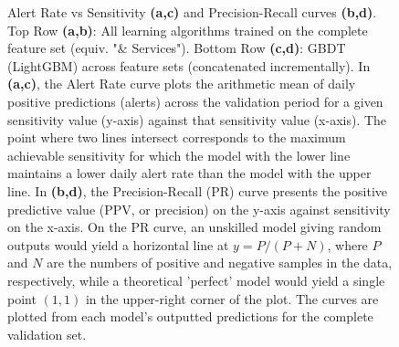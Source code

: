 \documentclass[fleqn,10pt]{wlscirep}
\begin{document}
\begin{figure}[htbp]
    \centering
    
    
    \caption{Alert Rate vs Sensitivity \textbf{(a,c)} and Precision-Recall curves \textbf{(b,d)}. Top Row \textbf{(a,b)}: All learning algorithms trained on the complete feature set (equiv. "\& Services"). Bottom Row \textbf{(c,d)}: GBDT (LightGBM) across feature sets (concatenated incrementally). In \textbf{(a,c)}, the Alert Rate curve plots the arithmetic mean of daily positive predictions (alerts) across the validation period for a given sensitivity value (y-axis) against that sensitivity value (x-axis). The point where two lines intersect corresponds to the maximum achievable sensitivity for which the model with the lower line maintains a lower daily alert rate than the model with the upper line. In \textbf{(b,d)}, the Precision-Recall (PR) curve presents the positive predictive value (PPV, or precision) on the y-axis against sensitivity on the x-axis. On the PR curve, an unskilled model giving random outputs would yield a horizontal line at $y=P/(P+N)$, where $P$ and $N$ are the numbers of positive and negative samples in the data, respectively, while a theoretical 'perfect' model would yield a single point $(1,1)$ in the upper-right corner of the plot. The curves are plotted from each model's outputted predictions for the complete validation set.}
    \label{fig:alert_pr_curves}
\end{figure}
\end{document}
